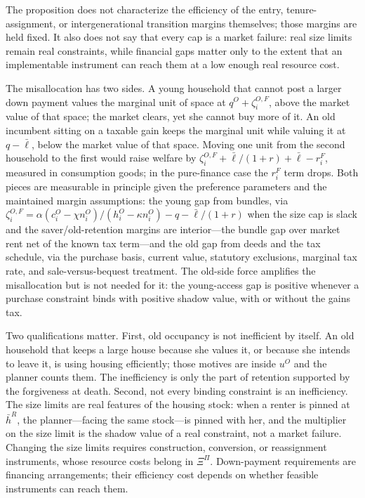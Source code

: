 \documentclass[11pt]{article}
\newcommand{\1}{\mathbf 1}
\begin{document}
The proposition does not characterize the efficiency of the entry, tenure-assignment, or intergenerational transition margins themselves; those margins are held fixed. It also does not say that every cap is a market failure: real size limits remain real constraints, while financial gaps matter only to the extent that an implementable instrument can reach them at a low enough real resource cost.

The misallocation has two sides. A young household that cannot post a larger down payment values the marginal unit of space at $q^O+\zeta_i^{O,F}$, above the market value of that space; the market clears, yet she cannot buy more of it. An old incumbent sitting on a taxable gain keeps the marginal unit while valuing it at $q-\bar\ell$, below the market value of that space. Moving one unit from the second household to the first would raise welfare by $\zeta_i^{O,F}+\bar\ell/(1+r)+\bar\ell-r_i^F$, measured in consumption goods; in the pure-finance case the $r_i^F$ term drops. Both pieces are measurable in principle given the preference parameters and the maintained margin assumptions: the young gap from bundles, via $\zeta_i^{O,F}=\alpha(c_i^O-\chi n_i^O)/(h_i^O-\kappa n_i^O)-q-\bar\ell/(1+r)$ when the size cap is slack and the saver/old-retention margins are interior---the bundle gap over market rent net of the known tax term---and the old gap from deeds and the tax schedule, via the purchase basis, current value, statutory exclusions, marginal tax rate, and sale-versus-bequest treatment. The old-side force amplifies the misallocation but is not needed for it: the young-access gap is positive whenever a purchase constraint binds with positive shadow value, with or without the gains tax.

Two qualifications matter. First, old occupancy is not inefficient by itself. An old household that keeps a large house because she values it, or because she intends to leave it, is using housing efficiently; those motives are inside $u^O$ and the planner counts them. The inefficiency is only the part of retention supported by the forgiveness at death. Second, not every binding constraint is an inefficiency. The size limits are real features of the housing stock: when a renter is pinned at $\bar h^R$, the planner---facing the same stock---is pinned with her, and the multiplier on the size limit is the shadow value of a real constraint, not a market failure. Changing the size limits requires construction, conversion, or reassignment instruments, whose resource costs belong in $\Xi^\Pi$. Down-payment requirements are financing arrangements; their efficiency cost depends on whether feasible instruments can reach them.
\end{document}
